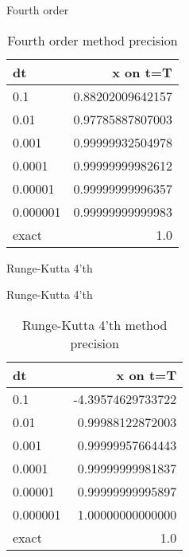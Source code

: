 \documentclass[10pt]{beamer}
\begin{document}
\begin{frame}{Fourth order}
  \begin{table}
    \caption{Fourth order method precision}
    \begin{tabular}{lr}
      \toprule
      dt & x on t=T\\
      \midrule
      0.1 & 0.88202009642157\\
      0.01 & 0.97785887807003\\
      0.001 & 0.99999932504978\\
      0.0001 & 0.99999999982612\\
      0.00001 & 0.99999999996357\\
      0.000001 & 0.99999999999983\\
      \midrule
      exact & 1.0 \\
      \bottomrule
    \end{tabular}
  \end{table}
\end{frame}

\begin{frame}{Runge-Kutta 4'th}
  \begin{figure}
  \end{figure}
\end{frame}

\begin{frame}{Runge-Kutta 4'th}
  \begin{table}
    \caption{Runge-Kutta 4'th method precision}
    \begin{tabular}{lr}
      \toprule
      dt & x on t=T\\
      \midrule
      0.1 & -4.39574629733722\\
      0.01 & 0.99988122872003\\
      0.001 & 0.99999957664443\\
      0.0001 & 0.99999999981837\\
      0.00001 & 0.99999999995897\\
      0.000001 & 1.00000000000000\\
      \midrule
      exact & 1.0 \\
      \bottomrule
    \end{tabular}
  \end{table}
\end{frame}
\end{document}
